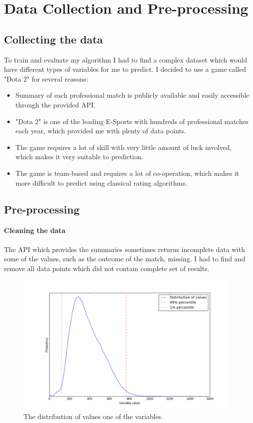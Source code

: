 \documentclass[12pt,a4paper]{book}
\begin{document}
\section{Data Collection and Pre-processing}
\subsection{Collecting the data}
To train and evaluate my algorithm I had to find a complex dataset which would have different types of variables for me to predict.
I decided to use a game called "Dota 2" for several reasons:
\begin{itemize}
\item Summary of each professional match is publicly available and easily accessible through the provided API.
\item "Dota 2" is one of the leading E-Sports with hundreds of professional matches each year, which provided me with plenty of data points.
\item The game requires a lot of skill with very little amount of luck involved, which makes it very suitable to prediction.
\item The game is team-based and requires a lot of co-operation, which makes it more difficult to predict using classical rating algorithms.
\end{itemize}
\begin{figure}

\end{figure}
\subsection{Pre-processing}
\paragraph{Cleaning the data}
The API which provides the summaries sometimes returns incomplete data with some of the values, such as the outcome of the match, missing.
I had to find and remove all data points which did not contain complete set of results.
\begin{figure}[ht]
\centering
\includegraphics[scale=0.5]{outliers}
\caption{The distribution of values one of the variables.}
\label{fig:outliers}
\end{figure}
\end{document}
